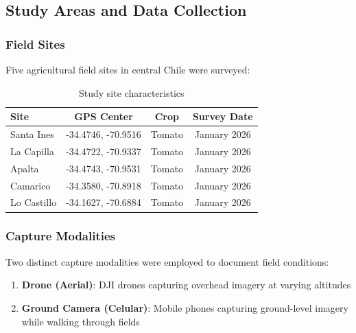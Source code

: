 
\subsection{Study Areas and Data Collection}

\subsubsection{Field Sites}

Five agricultural field sites in central Chile were surveyed:

\begin{table}[H]
\centering
\caption{Study site characteristics}
\label{tab:sites}
\begin{tabular}{lccc}
\toprule
\textbf{Site} & \textbf{GPS Center} & \textbf{Crop} & \textbf{Survey Date} \\
\midrule
Santa Ines & -34.4746, -70.9516 & Tomato & January 2026 \\
La Capilla & -34.4722, -70.9337 & Tomato & January 2026 \\
Apalta & -34.4743, -70.9531 & Tomato & January 2026 \\
Camarico & -34.3580, -70.8918 & Tomato & January 2026 \\
Lo Castillo & -34.1627, -70.6884 & Tomato & January 2026 \\
\bottomrule
\end{tabular}
\end{table}

\subsubsection{Capture Modalities}

Two distinct capture modalities were employed to document field conditions:

\begin{enumerate}
    \item \textbf{Drone (Aerial)}: DJI drones capturing overhead imagery at varying altitudes
    \item \textbf{Ground Camera (Celular)}: Mobile phones capturing ground-level imagery while walking through fields
\end{enumerate}

